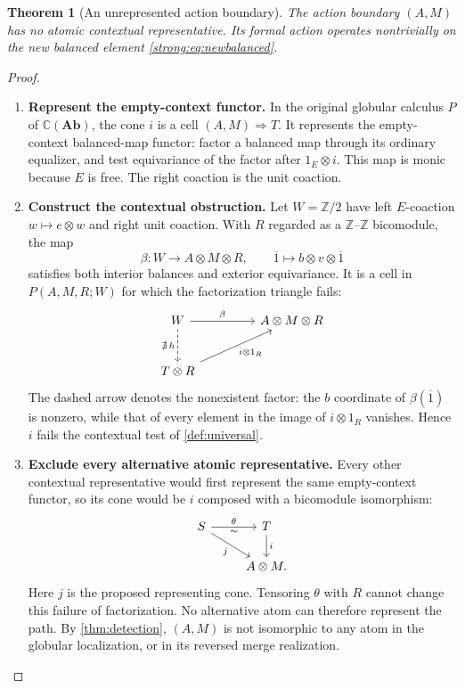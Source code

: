 \documentclass[11pt,reqno]{amsart}
\theoremstyle{plain}
\newtheorem{theorem}{Theorem}[section]
\theoremstyle{definition}
\theoremstyle{remark}
\numberwithin{equation}{section}
\newcommand{\Ccal}{\mathbb C}
\newcommand{\cell}{\mathrel{\Longrightarrow}}
\newcommand{\Ab}{\mathbf{Ab}}
\newcommand{\Z}{\mathbb Z}
\begin{document}
\begin{theorem}[An unrepresented action boundary]\label{strong:thm:strong}\label{strong:prop:strong}
The action boundary $(A,M)$ has no atomic contextual representative.
Its formal action operates nontrivially on the new balanced element
\eqref{strong:eq:newbalanced}.
\end{theorem}
\begin{proof}\leavevmode
\begin{enumerate}
\item \textbf{Represent the empty-context functor.} In the original globular calculus $P$ of $\Ccal(\Ab)$, the cone $i$
is a cell $(A,M)\cell T$. It represents the empty-context balanced-map
functor: factor a balanced map through its ordinary equalizer, and
test equivariance of the factor after $1_E\otimes i$. This map is
monic because $E$ is free. The right coaction is the unit coaction.

\item \textbf{Construct the contextual obstruction.} Let $W=\Z/2$ have left $E$-coaction $w\mapsto e\otimes w$ and right
unit coaction. With $R$ regarded as a $\Z$--$\Z$ bicomodule, the map
\[
\beta:W\longrightarrow A\otimes M\otimes R,\qquad
\overline1\longmapsto b\otimes v\otimes\overline1
\]
satisfies both interior balances and exterior equivariance. It is a
cell in $P(A,M,R;W)$ for which the factorization triangle fails:
\[
\begin{tikzcd}[column sep=4.4em,row sep=2.6em]
W \arrow[r,"\beta"] \arrow[d,dashed,"\nexists\,h"'] &
A\otimes M\otimes R\\
T\otimes R \arrow[ur,"i\otimes1_R"'] &
\end{tikzcd}
\]
The dashed arrow denotes the nonexistent factor: the $b$ coordinate
of $\beta(\overline1)$ is nonzero, while that of every element in the
image of $i\otimes1_R$ vanishes.
Hence $i$ fails the contextual test of \cref{def:universal}.

\item \textbf{Exclude every alternative atomic representative.} Every other contextual representative would first represent the same
empty-context functor, so its cone would be $i$ composed with a
bicomodule isomorphism:
\[
\begin{tikzcd}
S \arrow[r,"\theta","\sim"'] \arrow[dr,"j"'] &
T \arrow[d,"i"]\\
& A\otimes M.
\end{tikzcd}
\]
Here $j$ is the proposed representing cone. Tensoring $\theta$ with $R$ cannot
change this failure of factorization. No alternative atom can therefore
represent the path. By \cref{thm:detection}, $(A,M)$ is not
isomorphic to any atom in the globular localization, or in its reversed
merge realization.


\end{enumerate}
\end{proof}
\end{document}
